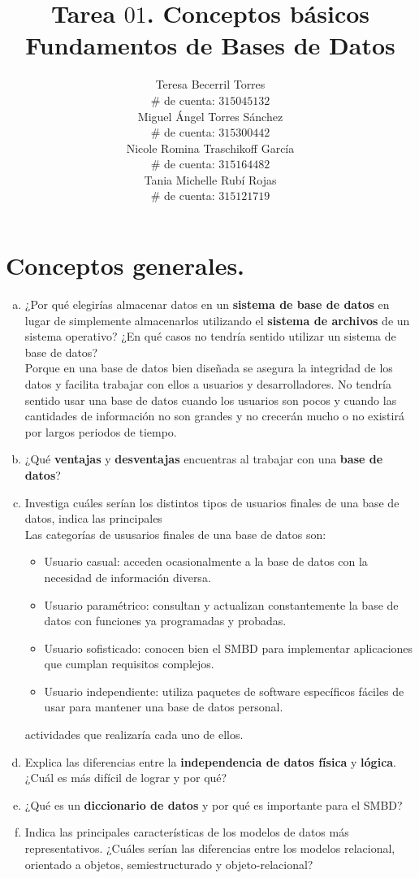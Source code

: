 \documentclass[letterpaper,12pt]{article}
\title{Tarea $01$. Conceptos básicos \\
       Fundamentos de Bases de Datos}
\author{Teresa Becerril Torres \\
        $\#$ de cuenta: $315045132$ \\
        Miguel Ángel Torres Sánchez \\
        $\#$ de cuenta: $315300442$ \\
        Nicole Romina Traschikoff García \\
        $\#$ de cuenta: $315164482$ \\
        Tania Michelle Rubí Rojas \\
        $\#$ de cuenta: $315121719$}
\begin{document}
\maketitle
    \section{Conceptos generales.}
          \begin{enumerate}[a. ]
            \item ¿Por qué elegirías almacenar datos en un \textbf{sistema de base de datos} en lugar de simplemente almacenarlos
            utilizando el \textbf{sistema de archivos} de un sistema operativo? ¿En qué casos no tendría sentido utilizar un sistema
            de base de datos? \\

            Porque en una base de datos bien diseñada se asegura la integridad de los datos y facilita trabajar con ellos a usuarios y desarrolladores. No tendría sentido usar una base de datos cuando los usuarios son pocos y cuando las cantidades de información no son grandes y no crecerán mucho o no existirá por largos periodos de tiempo.

            \item ¿Qué \textbf{ventajas} y \textbf{desventajas} encuentras al trabajar con una \textbf{base de datos}?
            \item Investiga cuáles serían los distintos tipos de usuarios finales de una base de datos, indica las principales \\
          Las categorías de ususarios finales de una base de datos son:

        	\begin{itemize}
        		\item Usuario casual: acceden ocasionalmente a la base de datos con la necesidad de información diversa.
        		\item Usuario paramétrico: consultan y actualizan constantemente la base de datos con funciones ya programadas y probadas.
        		\item Usuario sofisticado: conocen bien el SMBD para implementar aplicaciones que cumplan requisitos complejos.
        		\item Usuario independiente: utiliza paquetes de software específicos fáciles de usar para mantener una base de datos personal.
        	\end{itemize}
            actividades que realizaría cada uno de ellos.
            \item Explica las diferencias entre la \textbf{independencia de datos física} y \textbf{lógica}. ¿Cuál es más difícil de lograr y
            por qué?
            \item ¿Qué es un \textbf{diccionario de datos} y por qué es importante para el SMBD?
            \item Indica las principales características de los modelos de datos más representativos. ¿Cuáles serían las
            diferencias entre los modelos relacional, orientado a objetos, semiestructurado y objeto-relacional? \\
          \begin{itemize}


\end{itemize}
\end{enumerate}
\end{document}
